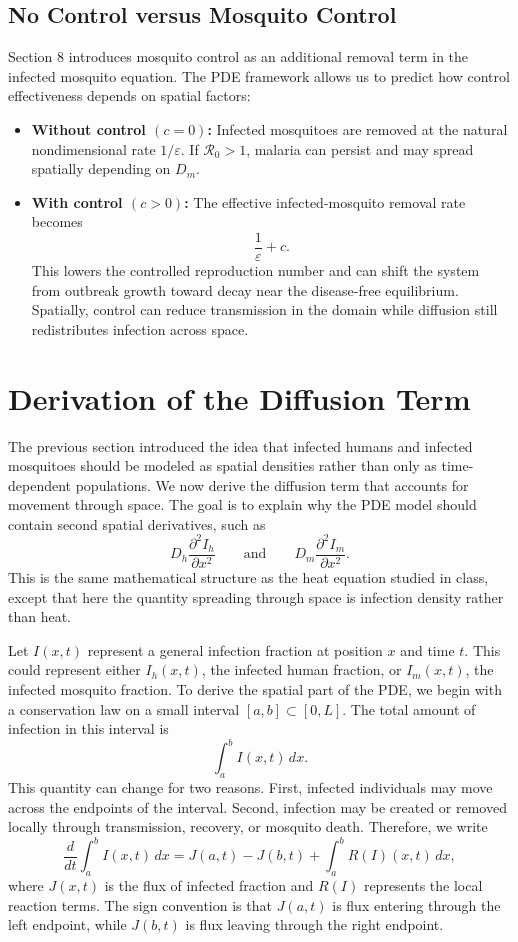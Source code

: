 \documentclass[12pt]{article}
\begin{document}
\subsection{No Control versus Mosquito Control}

Section 8 introduces mosquito control as an additional removal term in the infected mosquito equation. The PDE framework allows us to predict how control effectiveness depends on spatial factors:

\begin{itemize}
    \item \textbf{Without control \((c=0)\):} Infected mosquitoes are removed at the natural nondimensional rate \(1/\varepsilon\). If \(\mathcal{R}_0>1\), malaria can persist and may spread spatially depending on \(D_m\).

    \item \textbf{With control \((c>0)\):} The effective infected-mosquito removal rate becomes
    \[
    \frac{1}{\varepsilon}+c.
    \]
    This lowers the controlled reproduction number and can shift the system from outbreak growth toward decay near the disease-free equilibrium. Spatially, control can reduce transmission in the domain while diffusion still redistributes infection across space.
\end{itemize}

\section{Derivation of the Diffusion Term}

The previous section introduced the idea that infected humans and infected mosquitoes should be modeled as spatial densities rather than only as time-dependent populations. We now derive the diffusion term that accounts for movement through space. The goal is to explain why the PDE model should contain second spatial derivatives, such as
\[
D_h \frac{\partial^2 I_h}{\partial x^2}
\qquad \text{and} \qquad
D_m \frac{\partial^2 I_m}{\partial x^2}.
\]
This is the same mathematical structure as the heat equation studied in class, except that here the quantity spreading through space is infection density rather than heat.

Let \(I(x,t)\) represent a general infection fraction at position \(x\) and time \(t\). This could represent either \(I_h(x,t)\), the infected human fraction, or \(I_m(x,t)\), the infected mosquito fraction. To derive the spatial part of the PDE, we begin with a conservation law on a small interval \([a,b]\subset [0,L]\). The total amount of infection in this interval is
\[
\int_a^b I(x,t)\,dx.
\]
This quantity can change for two reasons. First, infected individuals may move across the endpoints of the interval. Second, infection may be created or removed locally through transmission, recovery, or mosquito death. Therefore, we write
\[
\frac{d}{dt}\int_a^b I(x,t)\,dx
=
J(a,t)-J(b,t)+\int_a^b R(I)(x,t)\,dx,
\]
where \(J(x,t)\) is the flux of infected fraction and \(R(I)\) represents the local reaction terms. The sign convention is that \(J(a,t)\) is flux entering through the left endpoint, while \(J(b,t)\) is flux leaving through the right endpoint.
\end{document}
